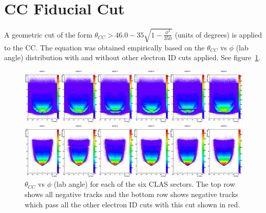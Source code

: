 \section{CC Fiducial Cut}
\label{sec:CCfiducial}
%
A geometric cut of the form $\theta_{CC} > 46.0 - 35\sqrt{1 - \frac{\phi^{2}}{350}}$ (units of degrees) is applied to the CC.
The equation was obtained empirically based on the $\theta_{CC}$ vs $\phi$ (lab angle) distribution with and without other electron ID cuts applied.
See figure~\ref{fig:CCfid_c0c1_6sects}.
%
\begin{figure}
\centering
\includegraphics[width=8.5in]{figures/CCfid_c0c1_6sects.png}
\caption{$\theta_{CC}$ vs $\phi$ (lab angle) for each of the six CLAS sectors. The top row shows all negative tracks and the bottom row shows negative tracks which pass all the other electron ID cuts with this cut shown in red.}
\label{fig:CCfid_c0c1_6sects}
\end{figure}
%
%
